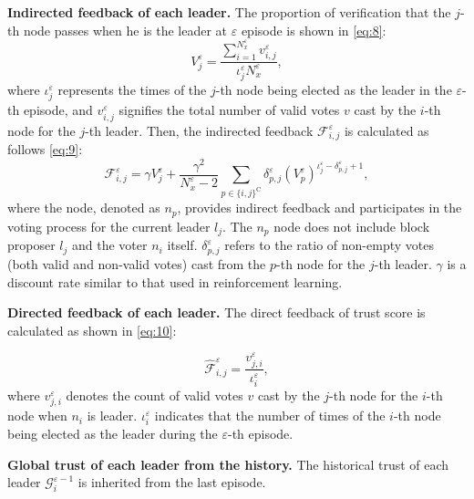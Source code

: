 \smallskip
\noindent\textbf{Indirected feedback of each leader.}  
The proportion of verification that the $j$-th node passes when he is the leader at $\varepsilon$ episode is shown in \eqref{eq:8}:
\begin{equation} 
\label{eq:8}
V_{j}^\varepsilon = \frac{\sum\nolimits_{{i}=1}^{N_x^\varepsilon}v_{{i},{j}}^\varepsilon }{\iota_{j}^\varepsilon N_x^\varepsilon},
\end{equation}
where $\iota_{j}^\varepsilon$ represents the times of the $j$-th node being elected as the leader in the $\varepsilon$-th episode, and $v_{{i},{j}}^\varepsilon$ signifies the total number of valid votes $v$ cast by the $i$-th node for the $j$-th leader. Then, the indirected feedback $\mathcal{F}_{i,j}^\varepsilon$ is calculated as follows \eqref{eq:9}:
\begin{equation} 
\mathcal{F}_{i,j}^\varepsilon = 
\gamma V_{{j}}^\varepsilon +  \frac{\gamma^2}{N_x^{\varepsilon}-2} \sum\limits_{p \in {\{{i},{j}\}^\text{C}}} \delta_{{p},{j}}^\varepsilon \left( V_{p}^{\varepsilon} \right)^{\iota^\varepsilon_{{j}}-\delta_{{p},{j}}^\varepsilon + 1},
\label{eq:9}
\end{equation}
where the node, denoted as $n_p$, provides indirect feedback and participates in the voting process for the current leader $l_j$. The $n_p$ node does not include block proposer $l_j$ and the voter $n_i$ itself. ${\delta^\varepsilon_{p,j}}$ refers to the ratio of non-empty votes (both valid and non-valid votes) cast from the $p$-th node for the $j$-th leader. $\gamma$ is a discount rate similar to that used in reinforcement learning.

\smallskip
\noindent\textbf{Directed feedback of each leader.} The direct feedback of trust score is calculated as shown in \eqref{eq:10}:

\begin{equation} 
\label{eq:10}
\hat{\mathcal{F}}_{i,j}^\varepsilon = \frac{v_{{j},{i}}^\varepsilon} {\iota_{i}^\varepsilon},
\end{equation}
where $v_{{j},{i}}^\varepsilon$ denotes the count of valid votes $v$ cast by the $j$-th node for the $i$-th node when $n_i$ is leader. $\iota_{i}^\varepsilon$ indicates that the number of times of the $i$-th node being elected as the leader during the $\varepsilon$-th episode.

\smallskip
\noindent\textbf{Global trust of each leader from the history.} The historical trust of each leader 
$\mathcal{G}_{i}^{\varepsilon-1}$ is inherited from the last episode.

